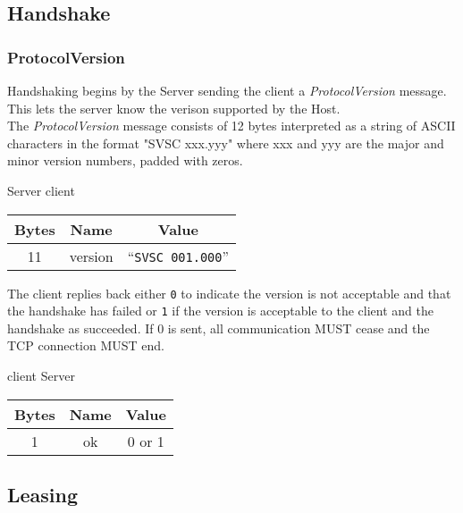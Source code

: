 \documentclass{article}
\begin{document}
    \subsection{Handshake}

    \subsubsection{ProtocolVersion}

    Handshaking begins by the Server sending the client a \emph{ProtocolVersion} message. This lets the server know the verison supported by the Host.\\

    The \emph{ProtocolVersion} message consists of 12 bytes interpreted as a string of ASCII characters in the format "SVSC xxx.yyy" where xxx and yyy are the major and minor version numbers, padded with zeros.

    \begin{center}
        Server \textrightarrow client\\
        \begin{tabular}{|c|c|c|}
            \hline
            \textbf{Bytes} & \textbf{Name} & \textbf{Value}            \\
            \hline
            11             & version       & ``\texttt{SVSC 001.000}'' \\
            \hline
        \end{tabular}
    \end{center}

    The client replies back either \texttt{0} to indicate the version is not acceptable and that the handshake has failed or \texttt{1} if the version is acceptable to the client and the handshake as succeeded. If 0 is sent, all communication MUST cease and the TCP connection MUST end.

    \begin{center}
        client \textrightarrow Server\\
        \begin{tabular}{|c|c|c|}
            \hline
            \textbf{Bytes} & \textbf{Name} & \textbf{Value} \\
            \hline
            1              & ok            & 0 or 1         \\
            \hline
        \end{tabular}
    \end{center}

    \subsection{Leasing}
\end{document}
